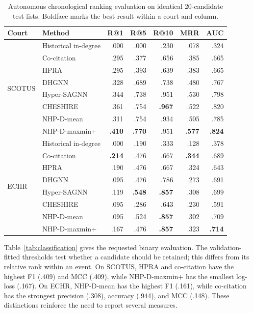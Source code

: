 \documentclass{svproc}
\begin{document}
\begin{table}[t]
\caption{Autonomous chronological ranking evaluation on identical 20-candidate test lists. Boldface marks the best result within a court and column.}
\label{tab:rankresults}
\centering
\footnotesize
\setlength{\tabcolsep}{2.6pt}
\renewcommand{\arraystretch}{.94}
\begin{tabular}{llrrrrr}
\toprule
Court & Method & R@1 & R@5 & R@10 & MRR & AUC\\
\midrule
\multirow{8}{*}{SCOTUS}
& Historical in-degree & .000 & .000 & .230 & .078 & .324\\
& Co-citation & .295 & .377 & .656 & .385 & .665\\
& HPRA & .295 & .393 & .639 & .383 & .665\\
& DHGNN & .328 & .689 & .738 & .480 & .767\\
& Hyper-SAGNN & .344 & .738 & .951 & .530 & .798\\
& CHESHIRE & .361 & .754 & \textbf{.967} & .522 & .820\\
& NHP-D-mean & .311 & .754 & .934 & .505 & .785\\
& NHP-D-maxmin+ & \textbf{.410} & \textbf{.770} & .951 & \textbf{.577} & \textbf{.824}\\
\midrule
\multirow{8}{*}{ECHR}
& Historical in-degree & .000 & .190 & .333 & .128 & .378\\
& Co-citation & \textbf{.214} & .476 & .667 & \textbf{.344} & .689\\
& HPRA & .190 & .476 & .667 & .324 & .643\\
& DHGNN & .095 & .476 & .786 & .273 & .691\\
& Hyper-SAGNN & .119 & \textbf{.548} & \textbf{.857} & .308 & .699\\
& CHESHIRE & .095 & .286 & .643 & .230 & .591\\
& NHP-D-mean & .095 & .524 & \textbf{.857} & .302 & .709\\
& NHP-D-maxmin+ & .167 & .476 & \textbf{.857} & .323 & \textbf{.714}\\
\bottomrule
\end{tabular}
\end{table}

Table~\ref{tab:classification} gives the requested binary evaluation. The validation-fitted thresholds test whether a candidate should be retained; this differs from its relative rank within an event. On SCOTUS, HPRA and co-citation have the highest F1 (.409) and MCC (.409), while NHP-D-maxmin+ has the smallest log-loss (.167). On ECHR, NHP-D-mean has the highest F1 (.161), while co-citation has the strongest precision (.308), accuracy (.944), and MCC (.148). These distinctions reinforce the need to report several measures.
\end{document}
